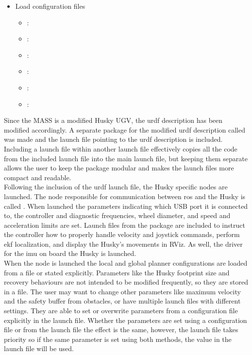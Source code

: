 \begin{itemize}
\begin{itemize}
\end{itemize}

\item Load configuration files

\begin{itemize}

\item {} : 
\item {} : 
\item {} : 
\item {} : 
\item {} : 
\item {} : 
\end{itemize}

\end{itemize}

Since the MASS is a modified Husky UGV, the \acrshort{urdf} description has been modified accordingly. A separate package for the modified \acrshort{urdf} description called  was made and the launch file pointing to the \acrshort{urdf} description is included. Including a launch file within another launch file effectively copies all the code from the included launch file into the main launch file, but keeping them separate allows the user to keep the package modular and makes the launch files more compact and readable.\\

Following the inclusion of the \acrshort{urdf} launch file, the Husky specific nodes are launched. The node responsible for communication between \acrshort{ros} and the Husky is called . When launched the parameters indicating which USB port it is connected to, the controller and diagnostic frequencies, wheel diameter, and speed and acceleration limits are set. Launch files from the  package are included to instruct the controller how to properly handle  velocity and joystick commands, perform \acrshort{ekf} localization, and display the Husky's movements in RViz. As well, the driver for the \acrshort{imu} on board the Husky is launched.\\

When the  node is launched the local and global planner configurations are loaded from a file or stated explicitly. Parameters like the Husky footprint size and recovery behaviours are not intended to be modified frequently, so they are stored in a file. The user may want to change other parameters like maximum velocity and the safety buffer from obstacles, or have multiple launch files with different settings. They are able to set or overwrite parameters from a configuration file explicitly in the launch file. Whether the parameters are set using a configuration file or from the launch file the effect is the same, however, the launch file takes priority so if the same parameter is set using both methods, the value in the launch file will be used.\\

